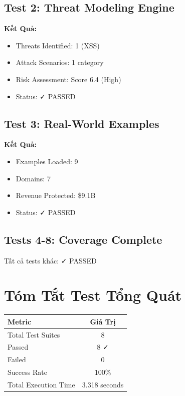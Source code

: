\documentclass[12pt,oneside]{report}
\begin{document}
\subsection{Test 2: Threat Modeling Engine}

\textbf{Kết Quả:}
\begin{itemize}
    \item Threats Identified: 1 (XSS)
    \item Attack Scenarios: 1 category
    \item Risk Assessment: Score 6.4 (High)
    \item Status: ✓ PASSED
\end{itemize}

\subsection{Test 3: Real-World Examples}

\textbf{Kết Quả:}
\begin{itemize}
    \item Examples Loaded: 9
    \item Domains: 7
    \item Revenue Protected: \$9.1B
    \item Status: ✓ PASSED
\end{itemize}

\subsection{Tests 4-8: Coverage Complete}

Tất cả tests khác: ✓ PASSED

\section{Tóm Tắt Test Tổng Quát}

\begin{table}[H]
\centering
\begin{tabular}{|l|c|}
\hline
\textbf{Metric} & \textbf{Giá Trị} \\
\hline
Total Test Suites & 8 \\
Passed & 8 ✓ \\
Failed & 0 \\
Success Rate & 100\% \\
Total Execution Time & 3.318 seconds \\
\hline
\end{tabular}
\end{table}
\end{document}

